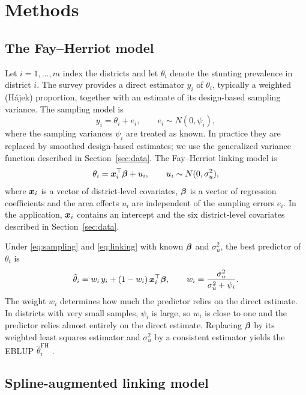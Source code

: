 \section{Methods}
\label{sec:methods}

\subsection{The Fay--Herriot model}
\label{sec:fh}

Let $i = 1, \dots, m$ index the districts and let $\theta_i$ denote the stunting
prevalence in district $i$. The survey provides a direct estimator $y_i$ of
$\theta_i$, typically a weighted (H\'ajek) proportion, together with an estimate
of its design-based sampling variance. The sampling model is
\begin{equation}
  y_i = \theta_i + e_i, \qquad e_i \sim N(0, \psi_i),
  \label{eq:sampling}
\end{equation}
where the sampling variances $\psi_i$ are treated as known. In practice they are
replaced by smoothed design-based estimates; we use the generalized variance
function described in Section~\ref{sec:data}. The Fay--Herriot linking model is
\begin{equation}
  \theta_i = \boldsymbol{x}_i^\top \boldsymbol{\beta} + u_i, \qquad u_i \sim N(0, \sigma_u^2),
  \label{eq:linking}
\end{equation}
where $\boldsymbol{x}_i$ is a vector of district-level covariates, $\boldsymbol{\beta}$ is a vector of
regression coefficients and the area effects $u_i$ are independent of the
sampling errors $e_i$. In the application, $\boldsymbol{x}_i$ contains an intercept and the
six district-level covariates described in Section~\ref{sec:data}.

Under \eqref{eq:sampling} and \eqref{eq:linking} with known $\boldsymbol{\beta}$ and
$\sigma_u^2$, the best predictor of $\theta_i$ is
\begin{equation}
  \tilde\theta_i = w_i\, y_i + (1 - w_i)\, \boldsymbol{x}_i^\top \boldsymbol{\beta},
  \qquad
  w_i = \frac{\sigma_u^2}{\sigma_u^2 + \psi_i}.
  \label{eq:bp}
\end{equation}
The weight $w_i$ determines how much the predictor relies on the direct
estimate. In districts with very small samples, $\psi_i$ is large, so $w_i$ is
close to one and the predictor relies almost entirely on the direct estimate.
Replacing $\boldsymbol{\beta}$ by its weighted least squares estimator and $\sigma_u^2$ by a
consistent estimator yields the EBLUP $\hat\theta_i^{\mathrm{FH}}$
\citep{prasad1990estimation}.

\subsection{Spline-augmented linking model}
\label{sec:safh}

